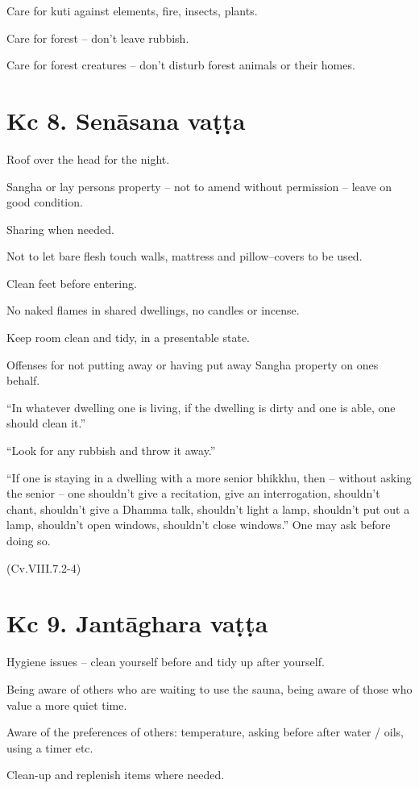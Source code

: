 Care for kuti against elements, fire, insects, plants.

Care for forest -- don't leave rubbish.

Care for forest creatures -- don't disturb forest animals or their
homes.

\section{Kc 8. Senāsana vaṭṭa}

Roof over the head for the night.

Sangha or lay persons property -- not to amend without permission --
leave on good condition.

Sharing when needed.

Not to let bare flesh touch walls, mattress and pillow--covers to be
used.

Clean feet before entering.

No naked flames in shared dwellings, no candles or incense.

Keep room clean and tidy, in a presentable state.

Offenses for not putting away or having put away Sangha property on ones
behalf.

``In whatever dwelling one is living, if the dwelling is dirty and one
is able, one should clean it.''

``Look for any rubbish and throw it away.''

``If one is staying in a dwelling with a more senior bhikkhu, then --
without asking the senior -- one shouldn't give a recitation, give an
interrogation, shouldn't chant, shouldn't give a Dhamma talk, shouldn't
light a lamp, shouldn't put out a lamp, shouldn't open windows,
shouldn't close windows.'' One may ask before doing so.

(Cv.VIII.7.2-4)

\section{Kc 9. Jantāghara vaṭṭa}

Hygiene issues -- clean yourself before and tidy up after yourself.

Being aware of others who are waiting to use the sauna, being aware of
those who value a more quiet time.

Aware of the preferences of others: temperature, asking before after
water / oils, using a timer etc.

Clean-up and replenish items where needed.

